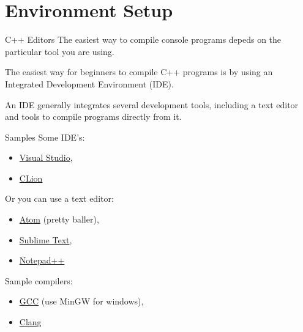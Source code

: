 \documentclass[../lecture1-introduction.tex]{subfiles}
\begin{document}
\section{Environment Setup}


\begin{frame}[fragile]{C++ Editors}
    The easiest way to compile console programs depeds on the particular tool you
    are using. \newline

    The easiest way for beginners to compile C++ programs is by using an Integrated
    Development Environment (IDE). \newline

    An IDE generally integrates several development tools, including a text editor
    and tools to compile programs directly from it.
\end{frame}


\begin{frame}[fragile]{Samples}
    Some IDE's:
    \begin{itemize}
        \item \href{https://www.visualstudio.com/}{Visual Studio},
        \item \href{https://www.jetbrains.com/clion/}{CLion}
    \end{itemize}

    Or you can use a text editor:
    \begin{itemize}
        \item \href{https://atom.io/}{Atom} (pretty baller),
        \item \href{https://www.sublimetext.com/}{Sublime Text},
        \item \href{https://notepad-plus-plus.org/}{Notepad++}
    \end{itemize}

    Sample compilers:
    \begin{itemize}
        \item \href{https://gcc.gnu.org/}{GCC} (use MinGW for windows),
        \item \href{http://clang.llvm.org/}{Clang}
    \end{itemize}
\end{frame}

\end{document}

